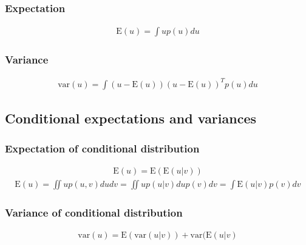 \documentclass[letterpaper,10pt,english]{jupyterBook}
\begin{document}
\subsubsection{Expectation}
\label{\detokenize{Lecture 2:expectation}}\begin{equation*}
\begin{split} \mathrm{E}(u)=\int up(u) d u \end{split}
\end{equation*}

\subsubsection{Variance}
\label{\detokenize{Lecture 2:variance}}\begin{equation*}
\begin{split} \mathrm{var}(u)=\int(u-\mathrm{E}(u))(u-\mathrm{E}(u))^T p(u) du\end{split}
\end{equation*}

\subsection{Conditional expectations and variances}
\label{\detokenize{Lecture 2:conditional-expectations-and-variances}}

\subsubsection{Expectation of conditional distribution}
\label{\detokenize{Lecture 2:expectation-of-conditional-distribution}}\begin{equation*}
\begin{split} \mathrm{E}(u)=\mathrm{E}(\mathrm{E}(u|v)) \end{split}
\end{equation*}\begin{equation*}
\begin{split} \mathrm{E}(u)=\iint u p(u,v) du dv =\iint u p(u|v) du p(v) dv=\int  \mathrm{E}(u|v)p(v)d v \end{split}
\end{equation*}

\subsubsection{Variance of conditional distribution}
\label{\detokenize{Lecture 2:variance-of-conditional-distribution}}\begin{equation*}
\begin{split} \mathrm{var}(u)=\mathrm{E}(\mathrm{var}(u|v))+\mathrm{var}(\mathrm{E}(u|v) \end{split}
\end{equation*}
\end{document}
